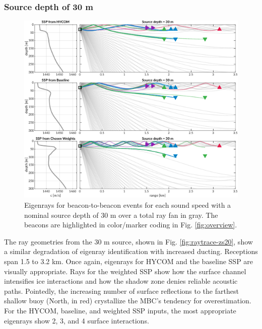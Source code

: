 \subsubsection{Source depth of 30 m}
\begin{figure}[ht!]
  \centering
  \includegraphics[width=\reprintcolumnwidth]{figs/raytrace-3env-zs-30.pdf}
  \caption{Eigenrays for beacon-to-beacon events for each sound speed with a nominal source depth of 30 m over a total ray fan in gray. The beacons are highlighted in color/marker coding in Fig. \ref{fig:overview}.}
  \label{fig:raytrace-zs30}
\end{figure}

The ray geometries from the 30 m source, shown in Fig. \ref{fig:raytrace-zs20}, show a similar degradation of eigenray identification with increased ducting.
Receptions span 1.5 to 3.2 km.
Once again, eigenrays for HYCOM and the baseline SSP are visually appropriate.
Rays for the weighted SSP show how the surface channel intensifies ice interactions and how the shadow zone denies reliable acoustic paths.
Pointedly, the increasing number of surface reflections to the farthest shallow buoy (North, in red) crystallize the MBC's tendency for overestimation.
For the HYCOM, baseline, and weighted SSP inputs, the most appropriate eigenrays show 2, 3, and 4 surface interactions.

